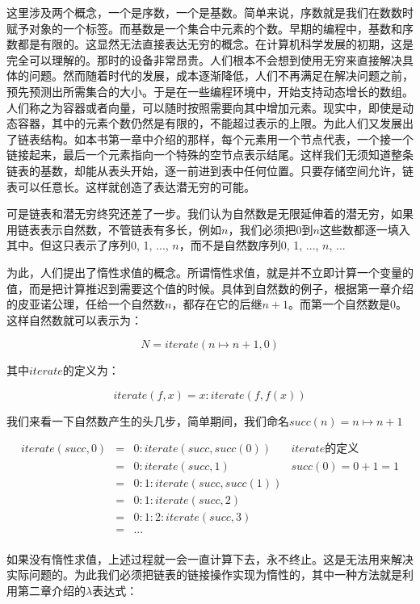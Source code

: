 \documentclass{article}
\begin{document}
这里涉及两个概念，一个是序数，一个是基数。简单来说，序数就是我们在数数时赋予对象的一个标签。而基数是一个集合中元素的个数。早期的编程中，基数和序数都是有限的。这显然无法直接表达无穷的概念。在计算机科学发展的初期，这是完全可以理解的。那时的设备非常昂贵。人们根本不会想到使用无穷来直接解决具体的问题。然而随着时代的发展，成本逐渐降低，人们不再满足在解决问题之前，预先预测出所需集合的大小。于是在一些编程环境中，开始支持动态增长的数组。人们称之为容器或者向量，可以随时按照需要向其中增加元素。现实中，即使是动态容器，其中的元素个数仍然是有限的，不能超过表示的上限。为此人们又发展出了链表结构。如本书第一章中介绍的那样，每个元素用一个节点代表，一个接一个链接起来，最后一个元素指向一个特殊的空节点表示结尾。这样我们无须知道整条链表的基数，却能从表头开始，逐一前进到表中任何位置。只要存储空间允许，链表可以任意长。这样就创造了表达潜无穷的可能。

可是链表和潜无穷终究还差了一步。我们认为自然数是无限延伸着的潜无穷，如果用链表表示自然数，不管链表有多长，例如$n$，我们必须把0到$n$这些数都逐一填入其中。但这只表示了序列0, 1, ..., $n$，而不是自然数序列0, 1, ..., $n$, ...

为此，人们提出了惰性求值的概念。所谓惰性求值，就是并不立即计算一个变量的值，而是把计算推迟到需要这个值的时候。具体到自然数的例子，根据第一章介绍的皮亚诺公理，任给一个自然数$n$，都存在它的后继$n+1$。而第一个自然数是0。这样自然数就可以表示为：

\[
N = iterate(n \mapsto n + 1, 0)
\]

其中$iterate$的定义为：

\[
iterate(f, x) = x : iterate(f, f(x))
\]

我们来看一下自然数产生的头几步，简单期间，我们命名$succ(n) = n \mapsto n +1$

\[
\begin{array}{rcll}
iterate(succ, 0) & = & 0 : iterate(succ, succ(0)) & iterate\text{的定义}\\
                 & = & 0 : iterate(succ, 1) & succ(0) = 0 + 1 = 1 \\
                 & = & 0 : 1 : iterate(succ, succ(1)) & \\
                 & = & 0 : 1 : iterate(succ, 2) & \\
                 & = & 0 : 1 : 2 : iterate(succ, 3) & \\
                 & = & ... & \\
\end{array}
\]

如果没有惰性求值，上述过程就一会一直计算下去，永不终止。这是无法用来解决实际问题的。为此我们必须把链表的链接操作实现为惰性的，其中一种方法就是利用第二章介绍的$\lambda$表达式：
\end{document}

